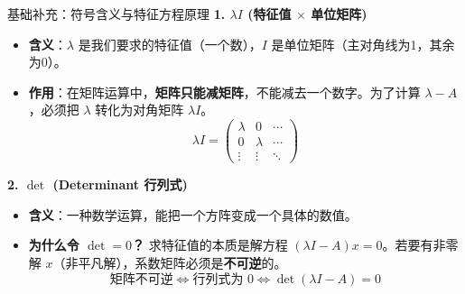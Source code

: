 \documentclass[12pt, a4paper]{article}
\begin{document}
\begin{knowpoint}{基础补充：符号含义与特征方程原理}
    \textbf{1. $\lambda I$ (特征值 $\times$ 单位矩阵)}
    \begin{itemize}
        \item \textbf{含义}：$\lambda$ 是我们要求的特征值（一个数），$I$ 是单位矩阵（主对角线为1，其余为0）。
        \item \textbf{作用}：在矩阵运算中，\textbf{矩阵只能减矩阵}，不能减去一个数字。为了计算 $\lambda - A$，必须把 $\lambda$ 转化为对角矩阵 $\lambda I$。
        \[ \lambda I = \begin{pmatrix} \lambda & 0 & \cdots \\ 0 & \lambda & \cdots \\ \vdots & \vdots & \ddots \end{pmatrix} \]
    \end{itemize}

    \textbf{2. $\det$ (Determinant 行列式)}
    \begin{itemize}
        \item \textbf{含义}：一种数学运算，能把一个方阵变成一个具体的数值。
        \item \textbf{为什么令 $\det = 0$？}
        求特征值的本质是解方程 $(\lambda I - A)x = 0$。若要有非零解 $x$（非平凡解），系数矩阵必须是\textbf{不可逆}的。
        \[ \text{矩阵不可逆} \iff \text{行列式为 0} \iff \det(\lambda I - A) = 0 \]
    \end{itemize}
\end{knowpoint}
\end{document}
